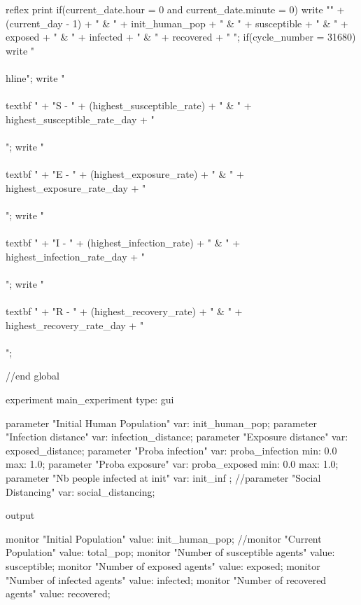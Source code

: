 \begin{verbatimtab}[4]
{        reflex print {
            if(current_date.hour = 0 and current_date.minute = 0){
                write "" + (current_day - 1) + " & " + init_human_pop + " & " + susceptible +
                 " & " + exposed + " & " + infected + " & " + recovered + " ";	
            }
            if(cycle_number = 31680){
                write "\\\\hline";
                write "\\\\textbf{ " + "S - " + (highest_susceptible_rate) + "} & " +
                 highest_susceptible_rate_day + " \\\\ ";
                write "\\\\textbf{ " + "E - " + (highest_exposure_rate) + "} & " +
                 highest_exposure_rate_day + " \\\\ ";
                write "\\\\textbf{ " + "I - " + (highest_infection_rate) + "} & " +
                 highest_infection_rate_day + " \\\\ ";
                write "\\\\textbf{ " + "R - " + (highest_recovery_rate) + "} & " +
                 highest_recovery_rate_day + " \\\\ ";
            }
        }
    
    }//end global
    
    experiment main_experiment type: gui {
        parameter "Initial Human Population" var: init_human_pop;
        parameter "Infection distance" var: infection_distance;
        parameter "Exposure distance" var: exposed_distance;
        parameter "Proba infection" var: proba_infection min: 0.0 max: 1.0;
        parameter "Proba exposure" var: proba_exposed min: 0.0 max: 1.0;
        parameter "Nb people infected at init" var: init_inf ;
        //parameter "Social Distancing" var: social_distancing;
        
        output {
            monitor "Initial Population" value: init_human_pop;
            //monitor "Current Population" value: total_pop;
            monitor "Number of susceptible agents" value: susceptible;
            monitor "Number of exposed agents" value: exposed;
            monitor "Number of infected agents" value: infected;
            monitor "Number of recovered agents" value: recovered;
            
}}
\end{verbatimtab}
